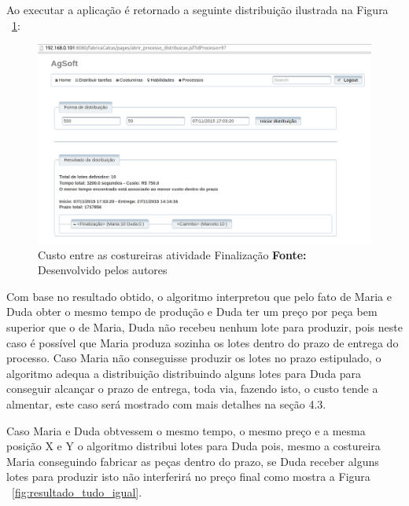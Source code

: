 \par Ao executar a aplicação é retornado a seguinte distribuição ilustrada na
Figura ~\ref{fig:resultado_custo}:

\newpage

\begin{figure}[h!]
	\centerline{\includegraphics[scale=0.4]{./imagens/resultado_teste2.png}}
	\caption[Custo entre as costureiras atividade Finalização]
	{Custo entre as costureiras atividade Finalização \textbf{Fonte:} Desenvolvido pelos autores}
	\label{fig:resultado_custo}
\end{figure}

\par Com base no resultado obtido, o algoritmo interpretou que pelo fato de
Maria e Duda obter o mesmo tempo de produção e Duda ter um preço por peça
bem superior que o de Maria, Duda não recebeu nenhum lote para produzir, pois neste
caso é possível que Maria produza sozinha os lotes dentro do prazo de entrega do
processo. Caso Maria não conseguisse produzir os lotes no prazo estipulado, o
algoritmo adequa a distribuição distribuindo alguns lotes para Duda para
conseguir alcançar o prazo de entrega, toda via, fazendo isto, o custo tende a
almentar, este caso será mostrado com mais detalhes na seção 4.3.

\par Caso Maria e Duda obtvessem o mesmo tempo, o mesmo preço e a mesma posição
X e Y o algoritmo distribui lotes para Duda pois, mesmo a costureira Maria
conseguindo fabricar as peças dentro do prazo, se Duda receber alguns lotes para produzir
isto não interferirá no preço final como mostra a Figura
~\ref{fig:resultado_tudo_igual}.
\newpage

